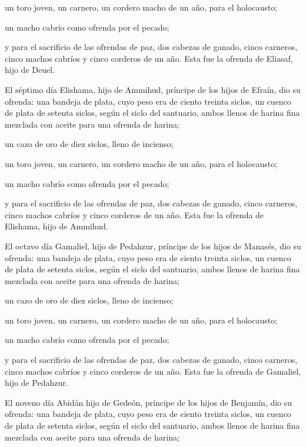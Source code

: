 \begin{paracol}{2}
 un toro joven, un carnero, un cordero macho de un año,
para el holocausto;

 un macho cabrío como ofrenda por el pecado;

 y para el sacrificio de las ofrendas de paz, dos cabezas
de ganado, cinco carneros, cinco machos cabríos y cinco corderos de un
año. Esta fue la ofrenda de Eliasaf, hijo de Deuel.

 El séptimo día Elishama, hijo de Ammihud, príncipe de
los hijos de Efraín,  dio su ofrenda: una bandeja de
plata, cuyo peso era de ciento treinta siclos, un cuenco de plata de
setenta siclos, según el siclo del santuario, ambos llenos de harina
fina mezclada con aceite para una ofrenda de harina;

 un cazo de oro de diez siclos, lleno de incienso;

 un toro joven, un carnero, un cordero macho de un año,
para el holocausto;

 un macho cabrío como ofrenda por el pecado;

 y para el sacrificio de las ofrendas de paz, dos cabezas
de ganado, cinco carneros, cinco machos cabríos y cinco corderos de un
año. Esta fue la ofrenda de Elishama, hijo de Ammihud.

 El octavo día Gamaliel, hijo de Pedahzur, príncipe de
los hijos de Manasés,  dio su ofrenda: una bandeja de
plata, cuyo peso era de ciento treinta siclos, un cuenco de plata de
setenta siclos, según el siclo del santuario, ambos llenos de harina
fina mezclada con aceite para una ofrenda de harina;

 un cazo de oro de diez siclos, lleno de incienso;

 un toro joven, un carnero, un cordero macho de un año,
para el holocausto;

 un macho cabrío como ofrenda por el pecado;

 y para el sacrificio de las ofrendas de paz, dos cabezas
de ganado, cinco carneros, cinco machos cabríos y cinco corderos de un
año. Esta fue la ofrenda de Gamaliel, hijo de Pedahzur.

 El noveno día Abidán hijo de Gedeón, príncipe de los
hijos de Benjamín,  dio su ofrenda: una bandeja de plata,
cuyo peso era de ciento treinta siclos, un cuenco de plata de setenta
siclos, según el siclo del santuario, ambos llenos de harina fina
mezclada con aceite para una ofrenda de harina;


\end{paracol}
